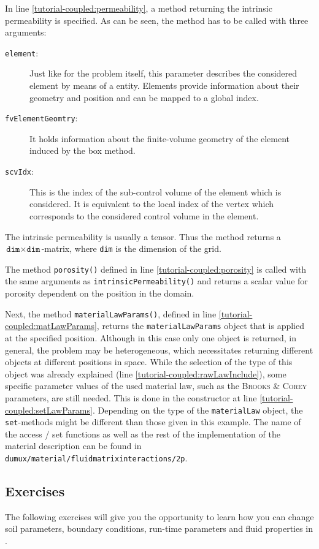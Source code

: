 In line \ref{tutorial-coupled:permeability}, a method returning the
intrinsic permeability is specified. As can be seen, the method has
to be called with three arguments:
\begin{description}
\item[\texttt{element}:] Just like for the problem itself, this
  parameter describes the considered element by means of a \Dune
  entity. Elements provide information about their geometry and
  position and can be mapped to a global index.
\item[\texttt{fvElementGeomtry}:] It holds information about the finite-volume
  geometry of the element induced by the box method.
\item[\texttt{scvIdx}:] This is the index of the sub-control volume of the
  element which is considered. It is equivalent to the local index
  of the vertex which corresponds to the considered control volume in
  the element.
\end{description}

The intrinsic permeability is usually a tensor. Thus the method returns
a $\texttt{dim} \times \texttt{dim}$-matrix, where \texttt{dim} is the
dimension of the grid.

The method \texttt{porosity()} defined in line
\ref{tutorial-coupled:porosity} is called with the same arguments as
\texttt{intrinsicPermeability()} and returns a scalar value for
porosity dependent on the position in the domain.

Next, the method \texttt{materialLawParams()}, defined in line
\ref{tutorial-coupled:matLawParams}, returns the
\verb+materialLawParams+ object that is applied at the specified
position. Although in this case only one object is returned, in
general, the problem may be heterogeneous, which necessitates
returning different objects at different positions in space.  While
the selection of the type of this object was already explained (line
\ref{tutorial-coupled:rawLawInclude}), some specific parameter values
of the used material law, such as the \textsc{Brooks} \&
\textsc{Corey} parameters, are still needed. This is done in the
constructor at line \ref{tutorial-coupled:setLawParams}.  Depending on
the type of the \texttt{materialLaw} object, the \texttt{set}-methods
might be different than those given in this example. The name of the
access / set functions as well as the rest of the implementation of
the material description can be found in
\verb+dumux/material/fluidmatrixinteractions/2p+.

\subsection{Exercises}
\label{tutorial-coupled:exercises}
The following exercises will give you the opportunity to learn how you
can change soil parameters, boundary conditions, run-time parameters
and fluid properties in \Dumux.

